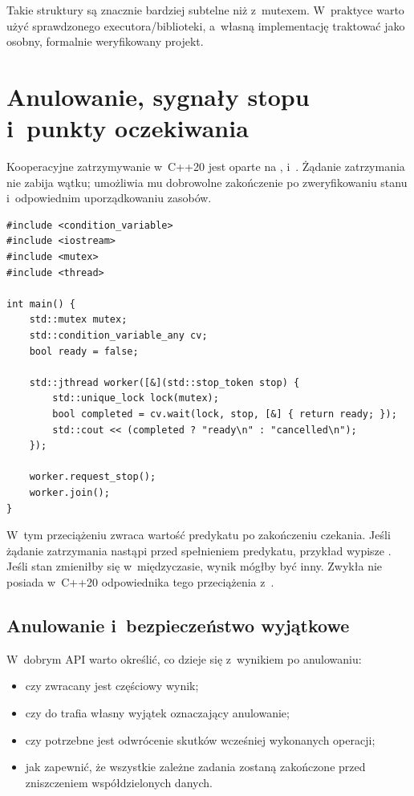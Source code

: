 Takie struktury są znacznie bardziej subtelne niż 
z~mutexem. W~praktyce warto użyć sprawdzonego executora/biblioteki,
a~własną implementację traktować jako osobny, formalnie weryfikowany projekt.

\section{Anulowanie, sygnały stopu i~punkty oczekiwania}
\label{sec:cpp16-cancel}

Kooperacyjne zatrzymywanie w~C++20 jest oparte na
,  i~.
Żądanie zatrzymania nie zabija wątku; umożliwia mu dobrowolne
zakończenie po zweryfikowaniu stanu i~odpowiednim uporządkowaniu zasobów.

\begin{lstlisting}[caption={Wybudzanie i anulowanie czekania (C++20).}]
#include <condition_variable>
#include <iostream>
#include <mutex>
#include <thread>

int main() {
    std::mutex mutex;
    std::condition_variable_any cv;
    bool ready = false;

    std::jthread worker([&](std::stop_token stop) {
        std::unique_lock lock(mutex);
        bool completed = cv.wait(lock, stop, [&] { return ready; });
        std::cout << (completed ? "ready\n" : "cancelled\n");
    });

    worker.request_stop();
    worker.join();
}
\end{lstlisting}

W~tym przeciążeniu  zwraca wartość predykatu po zakończeniu
czekania. Jeśli żądanie zatrzymania nastąpi przed spełnieniem
predykatu, przykład wypisze . Jeśli stan zmieniłby
się w~międzyczasie, wynik mógłby być inny. Zwykła
 nie posiada w~C++20 odpowiednika
tego przeciążenia z~.

\subsection{Anulowanie i~bezpieczeństwo wyjątkowe}

W~dobrym API warto określić, co dzieje się z~wynikiem po anulowaniu:
\begin{itemize}
\item czy zwracany jest częściowy wynik;
\item czy do  trafia własny wyjątek oznaczający anulowanie;
\item czy potrzebne jest odwrócenie skutków wcześniej wykonanych operacji;
\item jak zapewnić, że wszystkie zależne zadania zostaną zakończone
      przed zniszczeniem współdzielonych danych.
\end{itemize}

